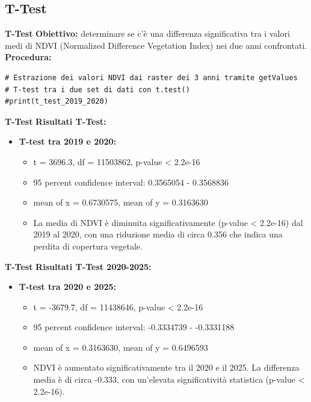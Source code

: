 \documentclass{beamer}
\begin{document}
\subsection{T-Test}
\begin{frame}[fragile]{\textbf{T-Test}}
\textbf{Obiettivo:} determinare se c'è una differenza significativa tra i valori medi di NDVI (Normalized Difference Vegetation Index) nei due anni confrontati.
\newline
\newline
\textbf{Procedura:}
\begin{lstlisting}
# Estrazione dei valori NDVI dai raster dei 3 anni tramite getValues
# T-test tra i due set di dati con t.test()
#print(t_test_2019_2020)
\end{lstlisting}
\end{frame}

\begin{frame}[fragile]{\textbf{T-Test}}
\textbf{Risultati T-Test:}
\begin{itemize}
    \item \textbf{T-test tra 2019 e 2020:}
    \begin{itemize}
        \item t = 3696.3, df = 11503862, p-value < 2.2e-16
        \item 95 percent confidence interval: 0.3565054 - 0.3568836
        \item mean of x = 0.6730575, mean of y = 0.3163630
        \item La media di NDVI è diminuita significativamente (p-value < 2.2e-16) dal 2019 al 2020, con una riduzione media di circa 0.356 che indica una perdita di copertura vegetale.
    \end{itemize}
\end{itemize}
\end{frame}

\begin{frame}[fragile]{\textbf{T-Test}}
\textbf{Risultati T-Test 2020-2025:}
\begin{itemize}
     \item \textbf{T-test tra 2020 e 2025:}
    \begin{itemize}
        \item t = -3679.7, df = 11438646, p-value < 2.2e-16
        \item 95 percent confidence interval: -0.3334739 - -0.3331188
        \item mean of x = 0.3163630, mean of y = 0.6496593
        \item NDVI è aumentato significativamente tra il 2020 e il 2025. La differenza media è di circa -0.333, con un'elevata significatività statistica (p-value < 2.2e-16).
    \end{itemize}
\end{itemize}
\end{frame}
\end{document}
